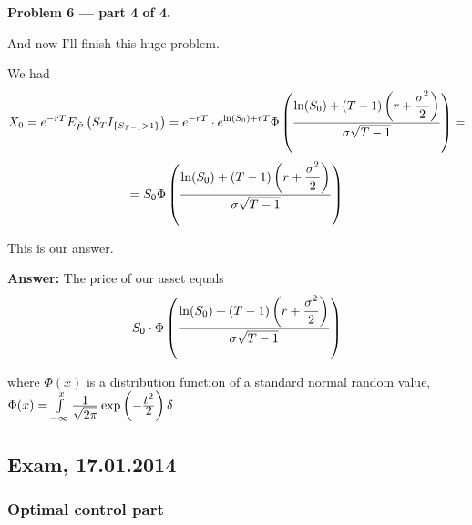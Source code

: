 \documentclass[pdftex,12pt,a4paper]{article}
\begin{document}
\textbf{Problem 6 --- part 4 of 4.}\par
And now I'll finish this huge problem.\par
We had
$$
X_{0} = e^{-rT}E_{\tilde{P}}\left(S_{T}I_{\{S_{T-1}> 1\}}\right) = e^{-rT}\cdot e^{\ln(S_{0}) + rT}\Phi\left(\frac{\displaystyle \ln(S_{0}) + (T-1)\left(r + \frac{\displaystyle \sigma^{2}}{\displaystyle 2}\right)}{\displaystyle \sigma\sqrt{T-1}}\right) = $$ $$=
S_{0}\Phi\left(\frac{\displaystyle \ln(S_{0}) + (T-1)\left(r + \frac{\displaystyle \sigma^{2}}{\displaystyle 2}\right)}{\displaystyle \sigma\sqrt{T-1}}\right)
$$\par
This is our answer.\[\]\par
\textbf{Answer:} The price of our asset equals
$$
S_{0}\cdot\Phi\left(\frac{\displaystyle \ln(S_{0}) + (T-1)\left(r + \frac{\displaystyle \sigma^{2}}{\displaystyle 2}\right)}{\displaystyle \sigma\sqrt{T-1}}\right)
$$\par
where $\Phi(x)$ is a distribution function of  a standard normal random value, $\Phi(x) = \int\limits_{-\infty}^{x}\frac{\displaystyle 1}{\displaystyle \sqrt{2\pi}}\exp\left(-\frac{\displaystyle t^{2}}{\displaystyle 2}\right)\delta$


\subsection{Exam, 17.01.2014}

\subsubsection*{Optimal control part}
\end{document}
